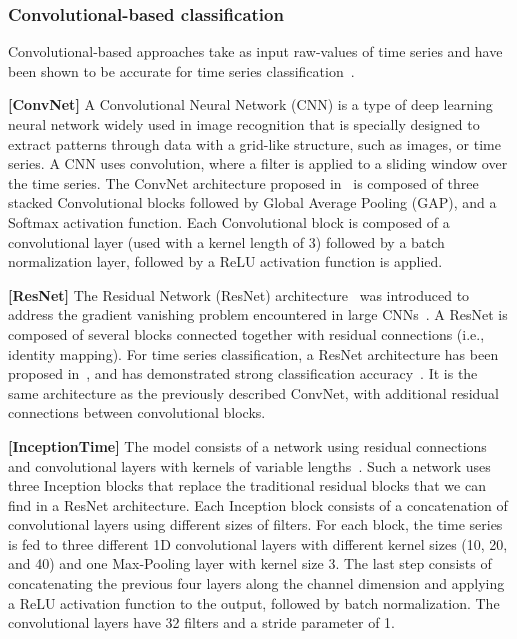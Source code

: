 \subsubsection{Convolutional-based classification}

Convolutional-based approaches take as input raw-values of time series and have been shown to be accurate for time series classification~\cite{DBLP:conf/sigmod/BoniolMRP22}.

\noindent\textbf{[ConvNet]}
A Convolutional Neural Network (CNN) \cite{DBLP:journals/corr/OSheaN15} is a type of deep learning neural network widely used in image recognition that is specially designed to extract patterns through data with a grid-like structure, such as images, or time series. A CNN uses convolution, where a filter is applied to a sliding window over the time series. The ConvNet architecture proposed in~\cite{DBLP:journals/corr/WangYO16} is composed of three stacked Convolutional blocks followed by Global Average Pooling (GAP), and a Softmax activation function. Each Convolutional block is composed of a convolutional layer (used with a kernel length of $3$) followed by a batch normalization layer, followed by a ReLU activation function is applied.

\noindent\textbf{[ResNet]}
The Residual Network (ResNet) architecture~\cite{https://doi.org/10.48550/arxiv.1512.03385} was introduced to address the gradient vanishing problem encountered in large CNNs~\cite{simonyan2015a}. A ResNet is composed of several blocks connected together with residual connections (i.e., identity mapping). For time series classification, a ResNet architecture has been proposed in~\cite{DBLP:journals/corr/WangYO16}, and has demonstrated strong classification accuracy~\cite{fawaz2019deep}. It is the same architecture as the previously described ConvNet, with additional residual connections between convolutional blocks.

\noindent\textbf{[InceptionTime]}
The model consists of a network using residual connections and convolutional layers with kernels of variable lengths~\cite{fawaz2020inceptiontime}. Such a network uses three Inception blocks that replace the traditional residual blocks that we can find in a ResNet architecture. Each Inception block consists of a concatenation of convolutional layers using different sizes of filters. For each block, the time series is fed to three different 1D convolutional layers with different kernel sizes (10, 20, and 40) and one Max-Pooling layer with kernel size 3. The last step consists of concatenating the previous four layers along the channel dimension and applying a ReLU activation function to the output, followed by batch normalization. The convolutional layers have 32 filters and a stride parameter of 1.


